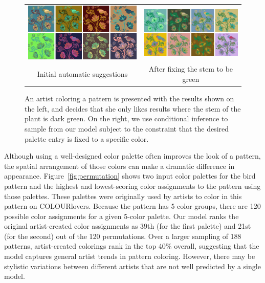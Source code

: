 \begin{figure}[ht]
\begin{tabular}{cc} 
\includegraphics[width=.475\linewidth]{figs/constrainedSearchUnconstrained}&\includegraphics[width=.475\linewidth]{figs/constrainedSearchConstrained}\\
Initial automatic suggestions & After fixing the stem to be green\\
\end{tabular}

\caption{An artist coloring a pattern is presented with the results shown on the left, and decides that she only likes results where the stem of the plant is dark green. On the right, we use conditional inference to sample from our model subject to the constraint that the desired palette entry is fixed to a specific color.}
\label{fig:constrainedInference}
\vspace{-1.0em}
\end{figure}



Although using a well-designed color palette often improves the look of a pattern, the spatial arrangement of those colors can make a dramatic difference in appearance. Figure~\ref{fig:permutation} shows two input color palettes for the bird pattern and the highest and lowest-scoring color assignments to the pattern using those palettes. These palettes were originally used by artists to color in this pattern on COLOURlovers. Because the pattern has 5 color groups, there are 120 possible color assignments for a given 5-color palette. Our model ranks the original artist-created color assignments as 39th (for the first palette) and 21st (for the second) out of the 120 permutations. Over a larger sampling of 188 patterns, artist-created colorings rank in the top 40\% overall, suggesting that the model captures general artist trends in pattern coloring. However, there may be stylistic variations between different artists that are not well predicted by a single model.

